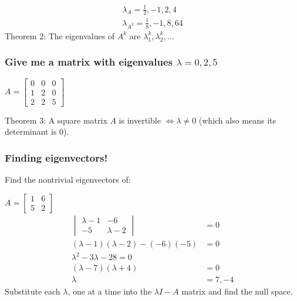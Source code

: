 \documentclass[
  letterpaper,
  DIV=11,
  numbers=noendperiod]{scrartcl}
\begin{document}
\begin{align*}
\lambda_A = \frac{1}{2}, -1, 2, 4 \\
\lambda_{A^3} = \frac{1}{8}, -1, 8, 64
\end{align*} Theorem 2: The eigenvalues of \(A^k\) are
\(\lambda_1^k, \lambda_2^k, ...\)

\hypertarget{give-me-a-matrix-with-eigenvalues-lambda-0-2-5}{%
\subsubsection{\texorpdfstring{Give me a matrix with eigenvalues
\(\lambda = 0, 2, 5\)}{Give me a matrix with eigenvalues \textbackslash lambda = 0, 2, 5}}\label{give-me-a-matrix-with-eigenvalues-lambda-0-2-5}}

\(A = \begin{bmatrix}0 & 0 & 0 \\ 1 & 2 & 0 \\ 2 & 2 & 5\end{bmatrix}\)

Theorem 3: A square matrix \(A\) is invertible \(\iff \lambda \neq 0\)
(which also means its determinant is 0).

\hypertarget{finding-eigenvectors}{%
\subsubsection{Finding eigenvectors!}\label{finding-eigenvectors}}

Find the nontrivial eigenvectors of:

\(A = \begin{bmatrix}1 & 6 \\ 5 & 2\end{bmatrix}\) \begin{align*}
\begin{vmatrix}\lambda-1 & -6 \\ -5 & \lambda-2\end{vmatrix} &= 0 \\
(\lambda-1)(\lambda-2)-(-6)(-5) &= 0 \\
\lambda^2-3\lambda-28=0 \\
(\lambda-7)(\lambda+4) &= 0 \\
\lambda &= 7, -4
\end{align*} Substitute each \(\lambda\), one at a time into the
\(\lambda I - A\) matrix and find the null space.
\end{document}
